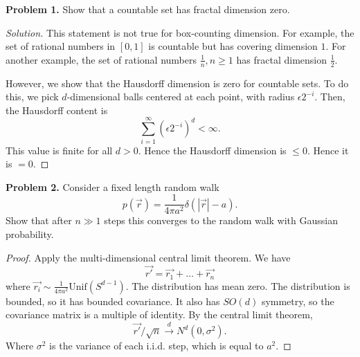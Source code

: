 
\textbf{Problem 1.} Show that a countable set has fractal dimension zero.

\begin{proof}[Solution]
	This statement is not true for box-counting dimension. For example, the set of rational numbers in $[0,1]$ is countable but has covering dimension $1$. For another example, the set of rational numbers $\frac{1}{n}, n \ge 1$ has fractal dimension $\frac{1}{2}$.

	However, we show that the Hausdorff dimension is zero for countable sets. To do this, we pick $d$-dimensional balls centered at each point, with radius $\epsilon 2^{-i}$. Then, the Hausdorff content is
	\[
		\sum_{i = 1}^\infty (\epsilon 2^{-i})^d < \infty 
	.\] 
	This value is finite for all $d > 0$. Hence the Hausdorff dimension is $\le 0$. Hence it is $= 0$.
\end{proof}

\textbf{Problem 2.} Consider a fixed length random walk
\[
	p(\vec{r} ) = \frac{1}{4 \pi a^2} \delta (|\vec{r} | - a)
.\] 
Show that after $ n \gg1$ steps this converges to the random walk with Gaussian probability.
\begin{proof}
	Apply the multi-dimensional central limit theorem. We have
	\[
		\vec{r'}  = \vec{r_1}  + \ldots + \vec{r_n} 
	\] 
	where $ \vec{r_i} \sim  \frac{1}{4 \pi a^2} \text{Unif}(S^{d - 1})$.
	The distribution has mean zero. The distribution is bounded, so it has bounded covariance. It also has $SO(d)$ symmetry, so the covariance matrix is a multiple of identity. By the central limit theorem,
	\[
		\vec{r'} / \sqrt{n}  \stackrel{d}{\to } N^d(0, \sigma^2)
	.\] 
	Where $\sigma^2$ is the variance of each i.i.d. step, which is equal to $a^2$.
\end{proof}

